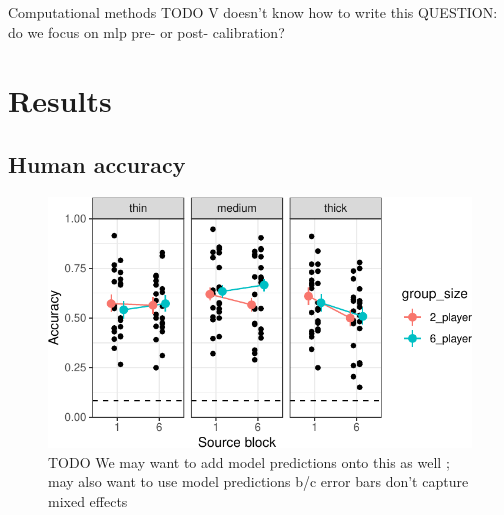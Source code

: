 \documentclass[10pt, letterpaper]{article}
\begin{document}
Computational methods TODO V doesn't know how to write this QUESTION: do
we focus on mlp pre- or post- calibration?

\section{Results}\label{results}

\subsection{Human accuracy}\label{human-accuracy}

\begin{CodeChunk}
\begin{figure}[t]

{\centering \includegraphics[width=1\linewidth]{figs/fig-1-1} 

}

\caption[TODO We may want to add model predictions onto this as well ]{TODO We may want to add model predictions onto this as well ; may also want to use model predictions b/c error bars don't capture mixed effects \label{TODO}}\label{fig:fig-1}
\end{figure}
\end{CodeChunk}
\end{document}
